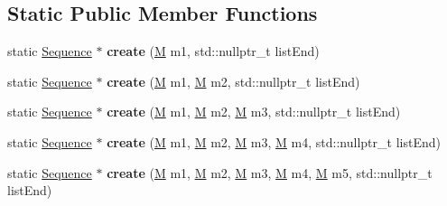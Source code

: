 \subsection*{Static Public Member Functions}
\begin{DoxyCompactItemize}
\item 
\mbox{\label{classSequence_a42a76c31f0064f04e73e425cb8a68eb8}} 
static \hyperlink{classSequence}{Sequence} $\ast$ {\bfseries create} (\hyperlink{classSequence_a6f34f8a978819442ffa4e9517ed49c10}{M} m1, std\+::nullptr\+\_\+t list\+End)
\item 
\mbox{\label{classSequence_a0e505f60480c6ce8f68b9dc74e60a425}} 
static \hyperlink{classSequence}{Sequence} $\ast$ {\bfseries create} (\hyperlink{classSequence_a6f34f8a978819442ffa4e9517ed49c10}{M} m1, \hyperlink{classSequence_a6f34f8a978819442ffa4e9517ed49c10}{M} m2, std\+::nullptr\+\_\+t list\+End)
\item 
\mbox{\label{classSequence_a63967d5c496a474358ea2a5065048996}} 
static \hyperlink{classSequence}{Sequence} $\ast$ {\bfseries create} (\hyperlink{classSequence_a6f34f8a978819442ffa4e9517ed49c10}{M} m1, \hyperlink{classSequence_a6f34f8a978819442ffa4e9517ed49c10}{M} m2, \hyperlink{classSequence_a6f34f8a978819442ffa4e9517ed49c10}{M} m3, std\+::nullptr\+\_\+t list\+End)
\item 
\mbox{\label{classSequence_a31fbda54779cb824c6dc1f647afeacad}} 
static \hyperlink{classSequence}{Sequence} $\ast$ {\bfseries create} (\hyperlink{classSequence_a6f34f8a978819442ffa4e9517ed49c10}{M} m1, \hyperlink{classSequence_a6f34f8a978819442ffa4e9517ed49c10}{M} m2, \hyperlink{classSequence_a6f34f8a978819442ffa4e9517ed49c10}{M} m3, \hyperlink{classSequence_a6f34f8a978819442ffa4e9517ed49c10}{M} m4, std\+::nullptr\+\_\+t list\+End)
\item 
\mbox{\label{classSequence_a57158d83c280db011e1a23b6a818e5d2}} 
static \hyperlink{classSequence}{Sequence} $\ast$ {\bfseries create} (\hyperlink{classSequence_a6f34f8a978819442ffa4e9517ed49c10}{M} m1, \hyperlink{classSequence_a6f34f8a978819442ffa4e9517ed49c10}{M} m2, \hyperlink{classSequence_a6f34f8a978819442ffa4e9517ed49c10}{M} m3, \hyperlink{classSequence_a6f34f8a978819442ffa4e9517ed49c10}{M} m4, \hyperlink{classSequence_a6f34f8a978819442ffa4e9517ed49c10}{M} m5, std\+::nullptr\+\_\+t list\+End)

\end{DoxyCompactItemize}
